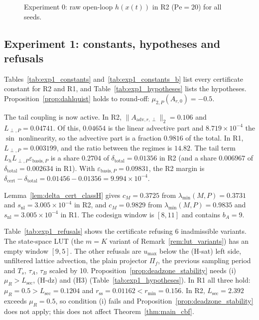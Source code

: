 
\begin{figure}[t]\centering{}
\caption{Experiment 0: raw open-loop \(h(x(t))\) in R2 (\(\mathrm{Pe}=20\)) for all seeds.}\label{fig:exp0}\end{figure}

\subsection{Experiment 1: constants, hypotheses and refusals}
Tables~\ref{tab:exp1_constants} and~\ref{tab:exp1_constants_b} list every certificate constant for R2 and R1, and
Table~\ref{tab:exp1_hypotheses} lists the hypotheses. Proposition~\ref{prop:dahlquist} holds to round-off:
\(\mu_{2,P}(A_{r,0}) = -0.5\).

The tail coupling is now active. In R2, \(\|A_{\mathrm{adv},r,\perp}\|_2 = 0.106\) and
\(L_{\perp,P} = 0.04741\). Of this, \(0.04654\) is the linear advective part and \(8.719\times10^{-4}\)
the \(\sin\) nonlinearity, so the advective part is a fraction \(0.9816\) of the total. In R1,
\(L_{\perp,P} = 0.003199\), and the ratio between the regimes is \(14.82\). The tail term
\(L_h L_{\perp,P}\varepsilon_{\mathrm{basis},P}\) is a share \(0.2704\) of
\(\delta_{\mathrm{total}} = 0.01356\) in R2 (and a share \(0.006967\) of
\(\delta_{\mathrm{total}} = 0.002634\) in R1). With
\(\varepsilon_{\mathrm{basis},P} = 0.09831\), the R2 margin is
\(\delta_{\mathrm{cert}} - \delta_{\mathrm{total}} = 0.01456 - 0.01356 = 9.994\times10^{-4}\).

Lemma~\ref{lem:delta_cert_classH} gives \(c_M = 0.3725\) from \(\lambda_{\min}(M,P) = 0.3731\) and
\(s_{\mathrm{nl}} = 3.005\times10^{-4}\) in R2, and \(c_M = 0.9829\) from \(\lambda_{\min}(M,P) = 0.9835\) and
\(s_{\mathrm{nl}} = 3.005\times10^{-4}\) in R1. The codesign window is
\([8, 11]\) and contains \(b_A = 9\).

Table~\ref{tab:exp1_refusals} shows the certificate refusing 6 inadmissible variants. The state-space LUT (the
\(m = K\) variant of Remark~\ref{rem:lut_variants}) has an empty window \([9,5]\). The other refusals are
\(u_{\max}\) below the (H-sat) left side, unfiltered lattice advection, the plain projector \(\Pi_f\), the previous
sampling period and \(T_s\), \(\tau_A\), \(\tau_B\) scaled by 10. Proposition~\ref{prop:deadzone_stability} needs (i) \(\mu_R > L_{\mathrm{sec}}\), (H-dz) and (H3)
(Table~\ref{tab:exp1_hypotheses}). In R1 all three hold: \(\mu_R = 0.5 > L_{\mathrm{sec}} = 0.1204\) and
\(r_{\mathrm{ss}} = 0.01162 < r_{\min} = 0.156\). In R2, \(L_{\mathrm{sec}} = 2.392\) exceeds
\(\mu_R = 0.5\), so condition (i) fails and Proposition~\ref{prop:deadzone_stability} does not apply; this does
not affect Theorem~\ref{thm:main_cbf}.

